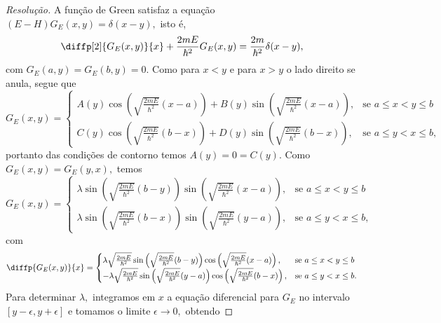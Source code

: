 \begin{proof}[Resolução]
   A função de Green satisfaz a equação \((E - H)G_E(x,y) = \delta(x - y),\) isto é,
   \begin{equation*}
      \diffp[2]{G_E(x,y)}{x} + \frac{2m E}{\hbar^2} G_E(x,y) = \frac{2m}{\hbar^2} \delta(x - y),
   \end{equation*}
   com \(G_E(a,y) = G_E(b,y) = 0\). Como para \(x < y\) e para \(x > y\) o lado direito se anula, segue que
   \begin{equation*}
      G_{E}(x,y) = \begin{cases}
         A(y) \cos\left(\sqrt{\frac{2mE}{\hbar^2}} (x-a)\right) + B(y)\sin\left(\sqrt{\frac{2mE}{\hbar^2}} (x-a)\right),&\text{se }a \leq x < y \leq b\\
         C(y) \cos\left(\sqrt{\frac{2mE}{\hbar^2}} (b-x)\right) + D(y)\sin\left(\sqrt{\frac{2mE}{\hbar^2}} (b-x)\right),&\text{se } a \leq y < x \leq b,
      \end{cases}
   \end{equation*}
   portanto das condições de contorno temos \(A(y) = 0 = C(y).\) Como \(G_E(x,y) = G_E(y,x),\) temos
   \begin{equation*}
      G_{E}(x,y) = \begin{cases}
         \lambda \sin\left(\sqrt{\frac{2mE}{\hbar^2}} (b-y)\right)\sin\left(\sqrt{\frac{2mE}{\hbar^2}} (x-a)\right),&\text{se }a \leq x < y \leq b\\
         \lambda \sin\left(\sqrt{\frac{2mE}{\hbar^2}} (b-x)\right)\sin\left(\sqrt{\frac{2mE}{\hbar^2}} (y-a)\right),&\text{se } a \leq y < x \leq b,
      \end{cases}
   \end{equation*}
   com
   \begin{equation*}
      \diffp{G_{E}(x,y)}{x} = \begin{cases}
         \lambda \sqrt{\frac{2mE}{\hbar^2}} \sin\left(\sqrt{\frac{2mE}{\hbar^2}} (b-y)\right)\cos\left(\sqrt{\frac{2mE}{\hbar^2}} (x-a)\right),&\text{se }a \leq x < y \leq b\\
         -\lambda \sqrt{\frac{2mE}{\hbar^2}}\sin\left(\sqrt{\frac{2mE}{\hbar^2}} (y-a)\right)\cos\left(\sqrt{\frac{2mE}{\hbar^2}} (b-x)\right),&\text{se } a \leq y < x \leq b.
      \end{cases}
   \end{equation*}
   Para determinar \(\lambda,\) integramos em \(x\) a equação diferencial para \(G_E\) no intervalo \([y - \epsilon, y + \epsilon]\) e tomamos o limite \(\epsilon \to 0,\) obtendo

\end{proof}

